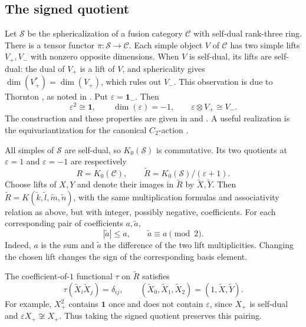 \documentclass[11pt,a4paper]{article}
\theoremstyle{definition}
\theoremstyle{remark}
\newcommand{\cC}{\mathcal C}
\newcommand{\cS}{\mathcal S}
\newcommand{\one}{\mathbf 1}
\newcommand{\eps}{\varepsilon}
\numberwithin{equation}{section}
\begin{document}
\subsection{The signed quotient}

Let $\cS$ be the sphericalization of a fusion category $\cC$ with self-dual rank-three ring. There is a tensor functor $\pi:\cS\to\cC$. Each simple object $V$ of $\cC$ has two simple lifts $V_+,V_-$
with nonzero opposite dimensions. When $V$ is self-dual, its lifts are
self-dual: the dual of $V_+$ is a lift of $V$, and sphericality gives
$\dim(V_+^*)=\dim(V_+)$, which rules out $V_-$.
This observation is due to Thornton \cite[proof of Lemma~2.3]{Thornton}, as noted in \cite[Section~5.1(a)]{Ostrik}. Put $\eps=\one_-$. Then
\[
 \eps^2\cong\one,\qquad \dim(\eps)=-1,\qquad
 \eps\otimes V_+\cong V_-.
\]
The construction and these properties are given in \cite[Remark~3.1 and Proposition~5.14]{ENO} and \cite[Section~5.1]{Ostrik}. A useful realization is the equivariantization for the canonical $C_2$-action \cite[Section~5.3]{Bartlett}.

All simples of $\cS$ are self-dual, so $K_0(\cS)$ is commutative. Its two quotients at $\eps=1$ and $\eps=-1$ are respectively
\[
 R=K_0(\cC),\qquad \widetilde R=K_0(\cS)/(\eps+1).
\]
Choose lifts of $X,Y$ and denote their images in $\widetilde R$ by $\widetilde X,\widetilde Y$. Then $\widetilde R=K(\widetilde k,\widetilde l,\widetilde m,\widetilde n)$, with the same multiplication formulas and associativity relation as above, but with integer, possibly negative, coefficients. For each corresponding pair of coefficients $a,\widetilde a$,
\begin{equation}\label{eq:signed}
 |\widetilde a|\leq a,\qquad \widetilde a\equiv a\pmod 2.
\end{equation}
Indeed, $a$ is the sum and $\widetilde a$ the difference of the two lift multiplicities. Changing the chosen lift changes the sign of the corresponding basis element.

The coefficient-of-$1$ functional $\tau$ on $\widetilde R$ satisfies
\begin{equation}\label{eq:orthonormal}
 \tau(\widetilde X_i\widetilde X_j)=\delta_{ij},
 \qquad (\widetilde X_0,\widetilde X_1,\widetilde X_2)=(1,\widetilde X,\widetilde Y).
\end{equation}
For example, $X_+^2$ contains $\one$ once and does not contain $\eps$, since $X_+$ is self-dual and $\eps X_+\not\cong X_+$. Thus taking the signed quotient preserves this pairing.
\end{document}
